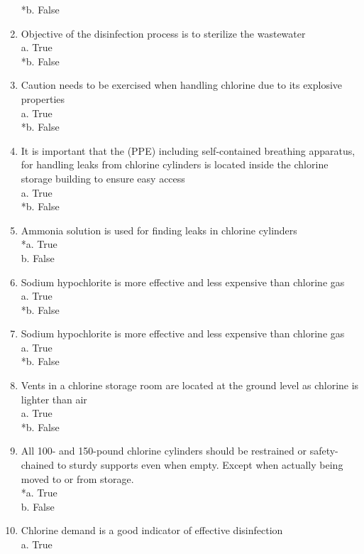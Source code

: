 \begin{enumerate}
*b. False \\
\item Objective of the disinfection process is to sterilize the wastewater \\
a. True \\
*b. False \\
\item Caution needs to be exercised when handling chlorine due to its explosive properties \\
a. True \\
*b. False \\
\item It is important that the (PPE) including self-contained breathing apparatus, for handling leaks from chlorine cylinders is located inside the chlorine storage building to ensure easy access \\
a. True \\
*b. False \\
\item Ammonia solution is used for finding leaks in chlorine cylinders \\
*a. True \\
b. False \\
\item Sodium hypochlorite is more effective and less expensive than chlorine gas \\
a. True \\
*b. False \\
\item Sodium hypochlorite is more effective and less expensive than chlorine gas \\
a. True \\
*b. False \\
\item Vents in a chlorine storage room are located at the ground level as chlorine is lighter than air \\
a. True \\
*b. False \\
\item All 100- and 150-pound chlorine cylinders should be restrained or safety-chained to sturdy supports even when empty. Except when actually being moved to or from storage. \\
*a. True \\
b. False \\
\item Chlorine demand is a good indicator of effective disinfection \\
a. True \\

\end{enumerate}
